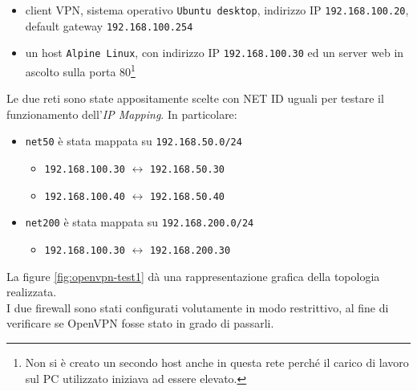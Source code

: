 \begin{itemize}
\begin{itemize}
\begin{itemize}
	      	      	\item client VPN, sistema operativo \texttt{Ubuntu desktop}, indirizzo
	      	      	      IP \texttt{192.168.100.20}, default gateway \texttt{192.168.100.254}
	      	      	\item un host \texttt{Alpine Linux}, con indirizzo IP
	      	      	      \texttt{192.168.100.30} ed un server
	      	      	      web in ascolto sulla porta 80\footnote{Non si è creato un secondo host anche
	      	      	      	in questa rete perché il carico di lavoro sul PC utilizzato iniziava ad
	      	      	      essere elevato.}
	      	      \end{itemize}
	      \end{itemize}
\end{itemize}
Le due reti sono state appositamente scelte con NET ID uguali per testare il funzionamento
dell'\textit{IP Mapping}. In particolare:
\begin{itemize}
	\item \texttt{net50} è stata mappata su \texttt{192.168.50.0/24}
	      \begin{itemize}
	      	\item \texttt{192.168.100.30} $\leftrightarrow$ \texttt{192.168.50.30}
	      	\item \texttt{192.168.100.40} $\leftrightarrow$ \texttt{192.168.50.40}
	      \end{itemize}
	\item \texttt{net200} è stata mappata su \texttt{192.168.200.0/24}
	      \begin{itemize}
	      	\item \texttt{192.168.100.30} $\leftrightarrow$ \texttt{192.168.200.30}
	      \end{itemize}
\end{itemize}
La figure \ref{fig:openvpn-test1} dà una rappresentazione grafica della topologia
realizzata.\\
I due firewall sono stati configurati volutamente in modo restrittivo, al fine
di verificare se OpenVPN fosse stato in grado di passarli.


